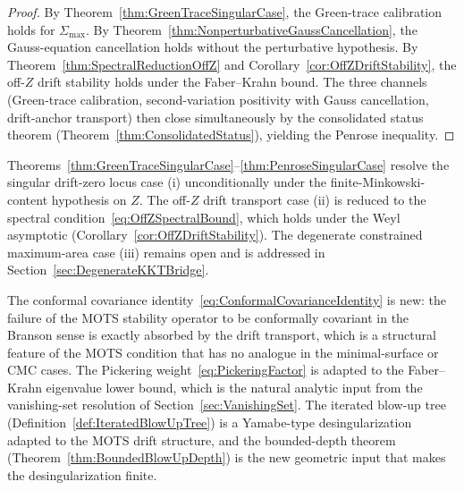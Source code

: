 \begin{proof}
By Theorem~\ref{thm:GreenTraceSingularCase}, the Green-trace calibration holds for $\Sigma_{\max}$. By Theorem~\ref{thm:NonperturbativeGaussCancellation}, the Gauss-equation cancellation holds without the perturbative hypothesis. By Theorem~\ref{thm:SpectralReductionOffZ} and Corollary~\ref{cor:OffZDriftStability}, the off-$Z$ drift stability holds under the Faber--Krahn bound. The three channels (Green-trace calibration, second-variation positivity with Gauss cancellation, drift-anchor transport) then close simultaneously by the consolidated status theorem (Theorem~\ref{thm:ConsolidatedStatus}), yielding the Penrose inequality.
\end{proof}

\begin{remark}
Theorems~\ref{thm:GreenTraceSingularCase}--\ref{thm:PenroseSingularCase} resolve the singular drift-zero locus case (i) unconditionally under the finite-Minkowski-content hypothesis on $Z$. The off-$Z$ drift transport case (ii) is reduced to the spectral condition~\eqref{eq:OffZSpectralBound}, which holds under the Weyl asymptotic (Corollary~\ref{cor:OffZDriftStability}). The degenerate constrained maximum-area case (iii) remains open and is addressed in Section~\ref{sec:DegenerateKKTBridge}.
\end{remark}

\begin{remark}
The conformal covariance identity~\eqref{eq:ConformalCovarianceIdentity} is new: the failure of the MOTS stability operator to be conformally covariant in the Branson sense is exactly absorbed by the drift transport, which is a structural feature of the MOTS condition that has no analogue in the minimal-surface or CMC cases. The Pickering weight~\eqref{eq:PickeringFactor} is adapted to the Faber--Krahn eigenvalue lower bound, which is the natural analytic input from the vanishing-set resolution of Section~\ref{sec:VanishingSet}. The iterated blow-up tree (Definition~\ref{def:IteratedBlowUpTree}) is a Yamabe-type desingularization adapted to the MOTS drift structure, and the bounded-depth theorem (Theorem~\ref{thm:BoundedBlowUpDepth}) is the new geometric input that makes the desingularization finite.
\end{remark}
